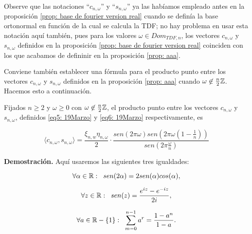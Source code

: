 \begin{nota}
\label{nota: notacion cnw, snw}
Observe que las notaciones 
``$c_{n, \omega}$'' y ``$s_{n, \omega}$'' ya las
habíamos empleado antes en la proposición 
\ref{prop: base de fourier version real} cuando se definía
la base ortonormal en función de la cual se calcula la TDF; no hay problema
en usar esta notación aquí también, pues para los valores 
$\omega \in Dom_{TDF, n}$, los vectores
$c_{n, \omega}$ y $s_{n, \omega}$ definidos en 
la proposición \ref{prop: base de fourier version real}
coinciden con los que acabamos de defininir en la proposición 
\ref{prop: aaa}.
\end{nota}

Conviene también establecer una fórmula para
el producto punto entre 
los vectores $c_{n, \omega}$ y $s_{n, \omega}$
definidos en la proposición \ref{prop: aaa}
cuando $\omega \not\in \frac{n}{2} \mathbb{Z}$.
Hacemos esto a continuación.

\begin{prop}
\label{prop: producto punto entre f y g}
Fijados $n \geq 2$ y $\omega \geq 0$ con 
$\omega \not\in \frac{n}{2}\mathbb{Z}$, 
el producto punto entre 
los vectores
$c_{n, \omega}$ y $s_{n, \omega}$, definidos 
\eqref{eq5: 19Marzo} y \eqref{eq6: 19Marzo}
respectivamente, es

\begin{equation}
\label{eq9: 19Marzo}
\langle c_{n, \omega} , s_{n, \omega} \rangle =
\frac{\xi_{n, w} \eta_{n, \omega}}{2} \cdot 
\frac{sen(2 \pi \omega)
sen(2 \pi \omega \left( 1- \frac{1}{n} \right))}{sen \left(2 \pi 
\frac{\omega}{n} \right)}
\end{equation}

\end{prop}
\noindent
\textbf{Demostración.}
Aquí usaremos las siguientes tres igualdades:

\begin{equation}
\label{eq10: 19Marzo}
\forall \alpha \in \mathbb{R}: \hspace{0.2cm}
sen(2 \alpha) = 2 sen(\alpha) cos(\alpha),
\end{equation}



\begin{equation}
\label{eq11: 19Marzo}
\forall z\in \mathbb{R}: \hspace{0.2cm}
sen(z)= \frac{e^{iz}-e^{-iz}}{2i},
\end{equation}



\begin{equation}
\label{eq12: 19Marzo}
\forall a \in \mathbb{R}-\{ 1 \}: \hspace{0.2cm}
\sum\limits_{m=0}^{n-1}a^{r}= \frac{1-a^{n}}{1-a}.
\end{equation}

